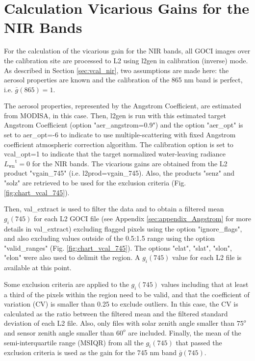 \documentclass[]{interact}
\theoremstyle{plain}%
\theoremstyle{definition}
\theoremstyle{remark}
\begin{document}
\section{Calculation Vicarious Gains for the NIR Bands}\label{sec:appendix_NIR}
For the calculation of the vicarious gain for the NIR bands, all GOCI images over the calibration site are processed to L2 using l2gen in calibration (inverse) mode. As described in Section \ref{sec:vcal_nir}, two assumptions are made here: the aerosol properties are known and the calibration of the 865 nm band is perfect, i.e. $\bar{g}(865)=1$. 

The aerosol properties, represented by the Angstrom Coefficient, are estimated from MODISA, in this case. Then, l2gen is run with this estimated target Angstrom Coefficient (option "aer\_angstrom=0.9") and the option "aer\_opt" is set to aer\_opt=-6 to indicate to use multiple-scattering with fixed Angstrom coefficient atmospheric correction algorithm. The calibration option is set to vcal\_opt=1 to indicate that the target normalized water-leaving radiance ${L_\text{wn}}^\text{t} = 0$ for the NIR bands. The vicarious gains are obtained from the L2 product "vgain\_745" (i.e. l2prod=vgain\_745). Also, the products "senz" and "solz" are retrieved to be used for the exclusion criteria (Fig. \ref{fig:chart_vcal_745}). 

Then, val\_extract is used to filter the data and to obtain a filtered mean $g_i(745)$ for each L2 GOCI file (see Appendix \ref{sec:appendix_Angstrom} for more details in val\_extract) excluding flagged pixels using the option "ignore\_flags", and also excluding values outside of the 0.5:1.5 range using the option "valid\_ranges" (Fig. \ref{fig:chart_vcal_745}).  The options "elat", "slat", "slon", "elon" were also used to delimit the region. A $g_i(745)$ value for each L2 file is available at this point.

Some exclusion criteria are applied to the $g_i(745)$ values including that at least a third of the pixels within the region need to be valid, and that the coefficient of variation (CV) is smaller than 0.25 to exclude outliers. In this case, the CV is calculated as the ratio between the filtered mean and the filtered standard deviation of each L2 file. Also, only files with solar zenith angle smaller than $75^o$ and sensor zenith angle smaller than $60^o$ are included. Finally, the mean of the semi-interquartile range (MSIQR) from all the $g_i(745)$ that passed the exclusion criteria is used as the gain for the 745 nm band $\bar{g}(745)$.
\end{document}
